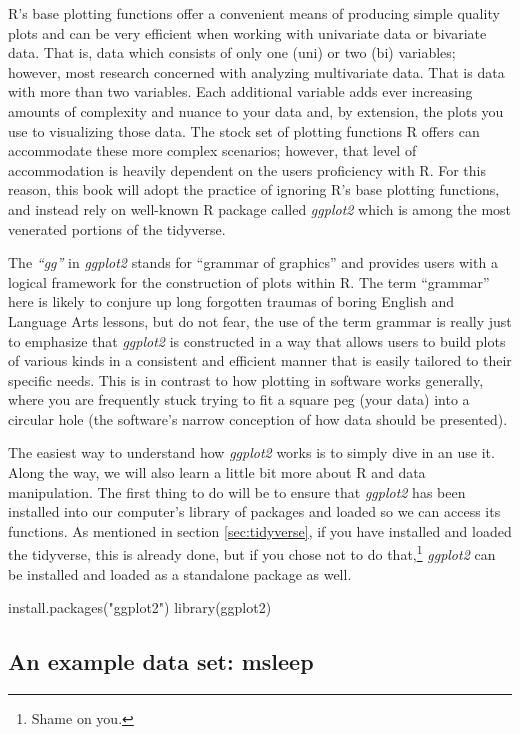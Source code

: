 R's base plotting functions offer a convenient means of producing simple quality plots and can be very efficient when working with \gls{univariate data} or \gls{bivariate data}.  That is, data which consists of only one (uni) or two (bi) variables; however, most research concerned with analyzing \gls{multivariate data}. That is data with more than two variables. Each additional variable adds ever increasing amounts of complexity and nuance to your data and, by extension, the plots you use to visualizing those data.  The stock set of plotting functions R offers can accommodate these more complex scenarios; however, that level of accommodation is heavily dependent on the users proficiency with R.  For this reason, this book will adopt the practice of ignoring R's base plotting functions, and instead rely on well-known R package called \textit{ggplot2} which is among the most venerated portions of the tidyverse.   

The \textit{``gg''} in \textit{ggplot2} stands for ``grammar of graphics'' and provides users with a logical framework for the construction of plots within R.  The term ``grammar'' here is likely to conjure up long forgotten traumas of boring English and Language Arts lessons, but do not fear, the use of the term grammar is really just to emphasize that \textit{ggplot2} is constructed in a way that allows users to build plots of various kinds in a consistent and efficient manner that is easily tailored to their specific needs.  This is in contrast to how plotting in software works generally, where you are frequently stuck trying to fit a square peg (your data) into a circular hole (the software's narrow conception of how data should be presented).

The easiest way to understand how \textit{ggplot2} works is to simply dive in an use it. Along the way, we will also learn a little bit more about R and data manipulation. The first thing to do will be to ensure that \textit{ggplot2} has been installed into our computer's library of packages and loaded so we can access its functions. As mentioned in section \ref{sec:tidyverse}, if you have installed and loaded the tidyverse, this is already done, but if you chose not to do that,\footnote{Shame on you.} \textit{ggplot2} can be installed and loaded as a standalone package as well.

\begin{inR}
install.packages("ggplot2")
library(ggplot2)
\end{inR}

\subsection{An example data set: msleep}

